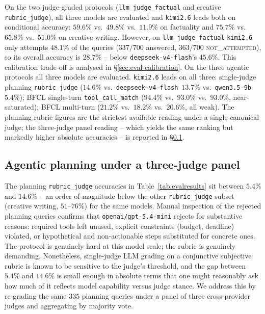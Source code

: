 \documentclass[11pt,a4paper]{article}
\begin{document}
On the two judge-graded protocols (\texttt{llm\_judge\_factual} and creative
\texttt{rubric\_judge}), all three models are evaluated and \texttt{kimi2.6}
leads both on conditional accuracy: $59.6\%$ vs.\ $49.8\%$ vs.\ $11.9\%$ on
factuality and $75.7\%$ vs.\ $65.8\%$ vs.\ $51.0\%$ on creative writing.
However, on \texttt{llm\_judge\_factual} \texttt{kimi2.6} only attempts $48.1\%$
of the queries ($337/700$ answered, $363/700$ \textsc{not\_attempted}), so its
overall accuracy is $28.7\%$ -- below \texttt{deepseek-v4-flash}'s $45.6\%$.
This calibration trade-off is analysed in
\S\ref{sec:eval-calibration}. On the three agentic protocols all three models are evaluated.
\texttt{kimi2.6} leads on all three: single-judge planning
\texttt{rubric\_judge} ($14.6\%$ vs.\ \texttt{deepseek-v4-flash}~$13.7\%$ vs.\
\texttt{qwen3.5-9b}~$5.4\%$); BFCL single-turn \texttt{tool\_call\_match}
($94.4\%$ vs.\ $93.0\%$ vs.\ $93.0\%$, near-saturated); BFCL multi-turn
($21.2\%$ vs.\ $18.2\%$ vs.\ $20.6\%$, all weak). The planning rubric figures
are the strictest available reading under a single canonical judge; the
three-judge panel reading -- which yields the same ranking but markedly
higher absolute accuracies -- is reported in §\ref{sec:eval-panel}.

\subsection{Agentic planning under a three-judge panel}\label{sec:eval-panel}

The planning \texttt{rubric\_judge} accuracies in Table~\ref{tab:evalresults}
sit between $5.4\%$ and $14.6\%$ -- an order of magnitude below the other
\texttt{rubric\_judge} subset (creative writing, $51$--$76\%$) for the same
models. Manual inspection of the rejected planning queries confirms that
\texttt{openai/gpt-5.4-mini} rejects for substantive reasons: required tools
left unused, explicit constraints (budget, deadline) violated, or hypothetical
and non-actionable steps substituted for concrete ones. The protocol is
genuinely hard at this model scale; the rubric is genuinely demanding.
Nonetheless, single-judge LLM grading on a conjunctive subjective rubric is
known to be sensitive to the judge's threshold, and the gap between $5.4\%$
and $14.6\%$ is small enough in absolute terms that one might reasonably ask
how much of it reflects model capability versus judge stance. We address this
by re-grading the same $335$ planning queries under a panel of three
cross-provider judges and aggregating by majority vote.
\end{document}
